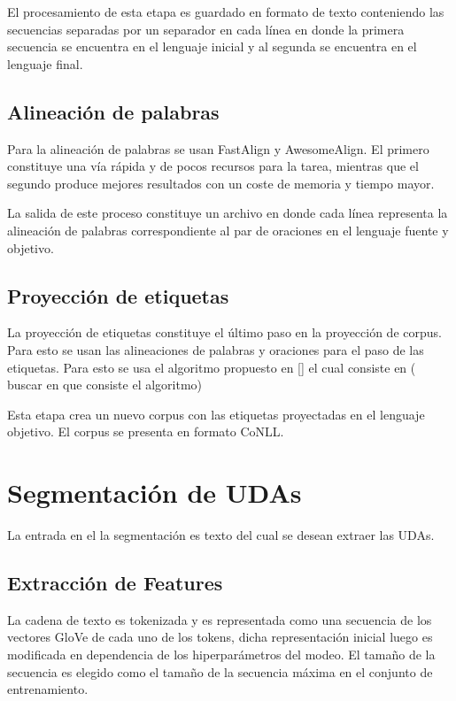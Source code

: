 El procesamiento de esta etapa es guardado en formato de texto conteniendo las 
secuencias separadas por un separador en cada línea en donde la primera secuencia se
encuentra en el lenguaje inicial y al segunda se encuentra en el lenguaje final.

\subsection{Alineación de palabras}

Para la alineación de palabras se usan FastAlign y AwesomeAlign. El primero constituye
una vía rápida y de pocos recursos para la tarea, mientras que el segundo produce mejores
resultados con un coste de memoria y tiempo mayor.

La salida de este proceso constituye un archivo en donde cada línea representa la 
alineación de palabras correspondiente al par de oraciones en el lenguaje fuente y objetivo. 

\subsection{Proyección de etiquetas}

La proyección de etiquetas constituye el último paso en la proyección de corpus. Para esto
se usan las alineaciones de palabras y oraciones para el paso de las etiquetas. Para esto
se usa el algoritmo propuesto en [\cite{eger2018cross}] el cual consiste en ( buscar en
que consiste el algoritmo)

Esta etapa crea un nuevo corpus con las etiquetas proyectadas en el lenguaje objetivo. El 
corpus se presenta en formato CoNLL.

\section{Segmentación de UDAs}

La entrada en el la segmentación es texto del cual se desean extraer las UDAs.

\subsection{Extracción de Features}

La cadena de texto es tokenizada y es representada como una secuencia 
de los vectores GloVe de cada uno de los tokens, dicha representación inicial 
luego es modificada en dependencia de los hiperparámetros del modeo. 
El tamaño de la secuencia es elegido como el tamaño de la secuencia máxima en el 
conjunto de entrenamiento.

